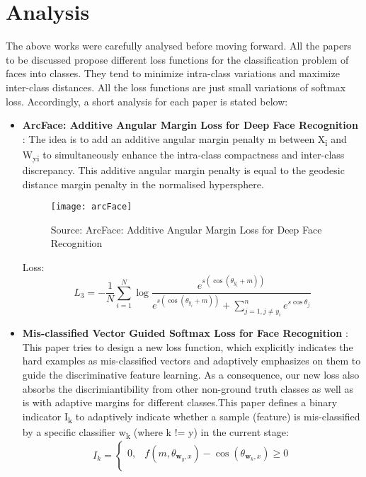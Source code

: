 \section{Analysis}
The above works were carefully analysed before moving forward.
All the papers to be discussed propose different loss functions for the classification problem of faces into classes. They tend to minimize intra-class variations and maximize inter-class distances. All the loss functions are just small variations of softmax loss. Accordingly, a short analysis for each paper is stated below:
\\
\begin{itemize}
	\item \textbf{ArcFace: Additive Angular Margin Loss for Deep Face Recognition} : The idea is to add an additive angular margin penalty m between X\textsubscript{i} and W\textsubscript{yi} to simultaneously enhance the intra-class compactness and inter-class discrepancy. This additive angular margin penalty is equal to the geodesic distance margin penalty in the normalised hypersphere.
	\begin{figure}[!h]
    		\centering
    		\texttt{[image: arcFace]}
    		\caption{Source: ArcFace: Additive Angular Margin Loss for Deep Face Recognition}
	\end{figure}
Loss: \begin{equation}
L_{3}=-\frac{1}{N} \sum_{i=1}^{N} \log \frac{e^{s\left(\cos \left(\theta_{y_{i}}+m\right)\right)}}{e^{s\left(\cos \left(\theta_{y_{i}}+m\right)\right)}+\sum_{j=1, j \neq y_{i}}^{n} e^{s \cos \theta_{j}}}
\end{equation}
	\item \textbf{Mis-classified Vector Guided Softmax Loss for Face Recognition} : This paper tries to design a new loss function, which explicitly indicates the hard examples as mis-classified vectors and adaptively emphasizes on them to guide the discriminative feature learning.
As a consequence, our new loss also absorbs the discrimiantibility from other non-ground truth classes as well as is with adaptive margins for different classes.This paper defines a binary indicator I\textsubscript{k} to adaptively indicate whether a sample (feature) is mis-classified by a specific classifier w\textsubscript{k} (where k != y) in the current stage:
\begin{equation}
I_{k}=\left\{\begin{array}{ll}
0, & f\left(m, \theta_{\boldsymbol{w}_{y}, x}\right)-\cos \left(\theta_{\boldsymbol{w}_{k}, x}\right) \geq 0 \\

\end{array}
\end{equation}
\end{itemize}
